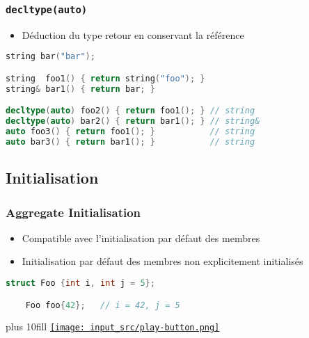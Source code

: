 \documentclass[C++.tex]{subfiles}
\begin{document}
\begin{frame}[fragile]
	\frametitle{\lstinline|decltype(auto)|}
	\begin{itemize}
		\item Déduction du type retour en conservant la référence
	\end{itemize}

	\begin{lstlisting}[language=C++]
string bar("bar");

string  foo1() { return string("foo"); }
string& bar1() { return bar; }

decltype(auto) foo2() { return foo1(); } // string
decltype(auto) bar2() { return bar1(); } // string&
auto foo3() { return foo1(); }           // string
auto bar3() { return bar1(); }           // string\end{lstlisting}
\end{frame}

\subsection*{Initialisation}
\begin{frame}[fragile]
	\frametitle{Aggregate Initialisation}
	\begin{itemize}
		\item Compatible avec l'initialisation par défaut des membres
		\item Initialisation par défaut des membres non explicitement initialisés
	\end{itemize}

	\begin{lstlisting}[language=C++]
	struct Foo {int i, int j = 5};

	Foo foo{42};   // i = 42, j = 5\end{lstlisting}

	\vskip 10mm plus 10fill
	\hfill
	\href{https://godbolt.org/#g:!((g:!((g:!((h:codeEditor,i:(filename:'1',fontScale:14,fontUsePx:'0',j:1,lang:c%2B%2B,selection:(endColumn:1,endLineNumber:23,positionColumn:1,positionLineNumber:23,selectionStartColumn:1,selectionStartLineNumber:23,startColumn:1,startLineNumber:23),source:'%23include+%3Ciostream%3E%0A%0Astruct+Foo%0A%7B%0A++int+a%3B%0A++int+b+%3D+42%3B%0A%7D%3B%0A%0Aint+main()%0A%7B%0A++%7B%0A++++Foo+foo%7B6%7D%3B%0A%0A++++std::cout+%3C%3C+foo.a+%3C%3C+!'+!'+%3C%3C+foo.b+%3C%3C+!'%5Cn!'%3B%0A++%7D%0A%0A++%7B%0A++++Foo+foo%7B6,+5%7D%3B%0A%0A++++std::cout+%3C%3C+foo.a+%3C%3C+!'+!'+%3C%3C+foo.b+%3C%3C+!'%5Cn!'%3B%0A++%7D%0A%7D%0A'),l:'5',n:'0',o:'C%2B%2B+source+%231',t:'0')),k:50,l:'4',n:'0',o:'',s:0,t:'0'),(g:!((h:executor,i:(argsPanelShown:'1',compilationPanelShown:'0',compiler:g112,compilerOutShown:'0',execArgs:'',execStdin:'',fontScale:14,fontUsePx:'0',j:1,lang:c%2B%2B,libs:!((name:boost,ver:'175')),options:'-std%3Dc%2B%2B14',source:1,stdinPanelShown:'1',tree:'1',wrap:'0'),l:'5',n:'0',o:'Executor+x86-64+gcc+11.2+(C%2B%2B,+Editor+%231)',t:'0')),header:(),k:50,l:'4',n:'0',o:'',s:0,t:'0')),l:'2',n:'0',o:'',t:'0')),version:4}{\texttt{[image: input\_src/play-button.png]}}
\end{frame}
\end{document}

